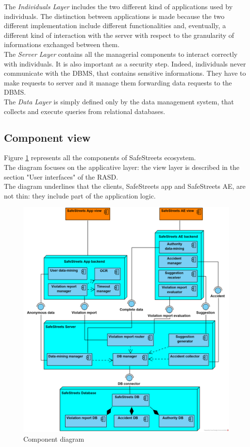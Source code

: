 \documentclass{article}
\begin{document}
		The \textit{Individuals Layer} includes the two different kind of applications used by individuals. The distinction between applications is made because the two different implementation include different functionalities and, eventually, a different kind of interaction with the server with respect to the granularity of informations exchanged between them. \\
		The \textit{Server Layer} contains all the managerial components to interact correctly with individuals. It is also important as a security step. Indeed, individuals never communicate with the DBMS, that contains sensitive informations. They have to make requests to server and it manage them forwarding data requests to the DBMS. \\
		The \textit{Data Layer} is simply defined only by the data management system, that collects and execute queries from relational databases.
		
		\clearpage
		\subsection{Component view}
		Figure \ref{fig:component_diagram} represents all the components of SafeStreets ecosystem.\\
		The diagram focuses on the applicative layer: the view layer is described in the section "User interfaces" of the RASD.\\
		The diagram underlines that the clients, SafeStreets app and SafeStreets AE, are not thin: they include part of the application logic.\\
		
		\begin{figure}[H]
			\includegraphics [scale=0.8] {diagrams/component_diagram.png}
			\caption[Component diagram]{Component diagram}
			\label{fig:component_diagram}
		\end{figure}
		
\end{document}

